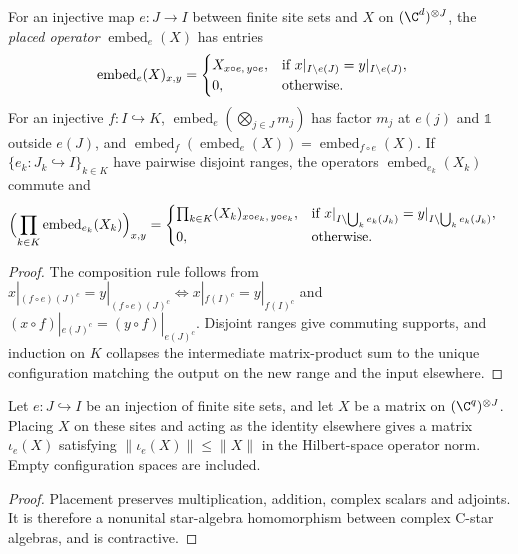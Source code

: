 \begin{lemma}
    \label{lem:qc_placed_operators}
    \leanok
    For an injective map $e\colon J\to I$ between finite site sets and $X$ on $(\C^d)^{\otimes J}$, the \emph{placed operator} $\operatorname{embed}_e(X)$ has entries
    \begin{align}
        \operatorname{embed}_e(X)_{x,y}
         & =\begin{cases}X_{x\circ e,\,y\circ e},&\text{if }x|_{I\setminus e(J)}=y|_{I\setminus e(J)},\\0,&\text{otherwise.}\end{cases}\notag
    \end{align}
    For an injective $f\colon I\hookrightarrow K$, $\operatorname{embed}_e(\bigotimes_{j\in J}m_j)$ has factor $m_j$ at $e(j)$ and $\mathbb 1$ outside $e(J)$, and $\operatorname{embed}_f(\operatorname{embed}_e(X))=\operatorname{embed}_{f\circ e}(X)$. If $\{e_k\colon J_k\hookrightarrow I\}_{k\in K}$ have pairwise disjoint ranges, the operators $\operatorname{embed}_{e_k}(X_k)$ commute and
    \begin{align}
        \Bigl(\prod_{k\in K}\operatorname{embed}_{e_k}(X_k)\Bigr)_{x,y}
         & =\begin{cases}\prod_{k\in K}(X_k)_{x\circ e_k,\,y\circ e_k},&\text{if }x|_{I\setminus\bigcup_k e_k(J_k)}=y|_{I\setminus\bigcup_k e_k(J_k)},\\0,&\text{otherwise.}\end{cases}\notag
    \end{align}
\end{lemma}
\begin{proof}
    \leanok
    The composition rule follows from $x|_{(f\circ e)(J)^c}=y|_{(f\circ e)(J)^c}\iff x|_{f(I)^c}=y|_{f(I)^c}$ and $(x\circ f)|_{e(J)^c}=(y\circ f)|_{e(J)^c}$. Disjoint ranges give commuting supports, and induction on $K$ collapses the intermediate matrix-product sum to the unique configuration matching the output on the new range and the input elsewhere.
\end{proof}

\begin{lemma}
    \label{lem:qc_placement_norm}
    \leanok
    Let $e:J\hookrightarrow I$ be an injection of finite site sets, and
    let $X$ be a matrix on $(\C^q)^{\otimes J}$. Placing $X$ on these
    sites and acting as the identity elsewhere gives a matrix $\iota_e(X)$
    satisfying $\|\iota_e(X)\|\leq\|X\|$ in the Hilbert-space operator norm.
    Empty configuration spaces are included.
\end{lemma}
\begin{proof}\leanok
    Placement preserves multiplication, addition, complex scalars and
    adjoints. It is therefore a nonunital star-algebra homomorphism
    between complex C-star algebras, and is contractive.
\end{proof}

